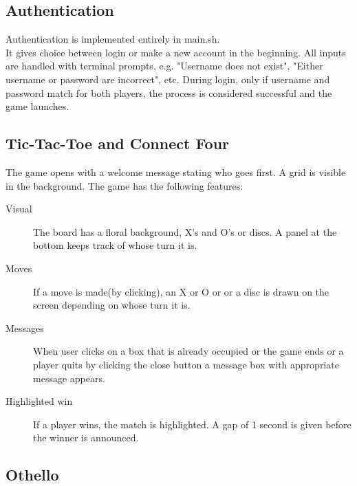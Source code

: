 \documentclass[12pt]{article}
\begin{document}
\subsection {Authentication}

Authentication is implemented entirely in main.sh. \\
\indent It gives choice between login or make a new account in the beginning. All inputs are handled with terminal prompts, e.g. "Username does not exist", "Either username or password are incorrect", etc. During login, only if username and password match for both players, the process is considered successful and the game launches.


\subsection {Tic-Tac-Toe and Connect Four}

The game opens with a welcome message stating who goes first. A grid is visible in the background. The game has the following features:

\begin{description} 
\item[Visual] The board has a floral background, X's and O's or discs. A panel at the bottom keeps track of whose turn it is.
\item[Moves] If a move is made(by clicking), an X or O or or a disc is drawn on the screen depending on whose turn it is.
\item[Messages] When user clicks on a box that is already occupied or the game ends or a player quits by clicking the close button a message box with appropriate message appears.
\item[Highlighted win] If a player wins, the match is highlighted. A gap of 1 second is given before the winner is announced.  

\end{description}

\subsection{Othello}
\end{document}
